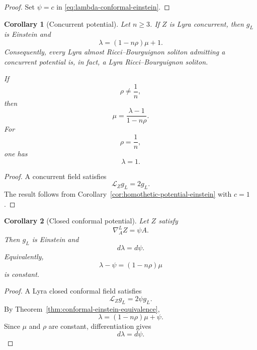 \documentclass[a4paper,11pt]{article}
\theoremstyle{plain}
\newtheorem{corollary} {Corollary}[section]
\numberwithin{equation}{section}
\begin{document}
\begin{proof}
	Set \(\psi=c\) in
	\eqref{eq:lambda-conformal-einstein}.
\end{proof}

\begin{corollary}[Concurrent potential]
	\label{cor:concurrent-potential-einstein}
	Let \(n\geq3\). If \(Z\) is Lyra concurrent, then \(g_{L}\) is
	Einstein and
	\begin{equation}
		\lambda
		=
		(1-n\rho)\mu+1.
		\label{eq:concurrent-soliton-relation}
	\end{equation}
	Consequently, every Lyra almost Ricci--Bourguignon soliton
	admitting a concurrent potential is, in fact, a Lyra
	Ricci--Bourguignon soliton.
	
	If
	\[
	\rho\neq\frac1n,
	\]
	then
	\begin{equation}
		\mu
		=
		\frac{\lambda-1}{1-n\rho}.
		\label{eq:concurrent-einstein-factor}
	\end{equation}
	For
	\[
	\rho=\frac1n,
	\]
	one has
	\begin{equation}
		\lambda=1.
		\label{eq:critical-concurrent-lambda}
	\end{equation}
\end{corollary}

\begin{proof}
	A concurrent field satisfies
	\[
	\mathcal L_{Z}g_{L}=2g_{L}.
	\]
	The result follows from
	Corollary~\ref{cor:homothetic-potential-einstein} with \(c=1\).
\end{proof}

\begin{corollary}[Closed conformal potential]
	\label{cor:closed-conformal-potential}
	Let \(Z\) satisfy
	\[
	\nabla^{L}_{A}Z=\psi A.
	\]
	Then \(g_{L}\) is Einstein and
	\begin{equation}
		d\lambda=d\psi.
		\label{eq:lambda-psi-differential}
	\end{equation}
	Equivalently,
	\begin{equation}
		\lambda-\psi
		=
		(1-n\rho)\mu
		\label{eq:lambda-psi-constant}
	\end{equation}
	is constant.
\end{corollary}

\begin{proof}
	A Lyra closed conformal field satisfies
	\[
	\mathcal L_{Z}g_{L}=2\psi g_{L}.
	\]
	By Theorem~\ref{thm:conformal-einstein-equivalence},
	\[
	\lambda
	=
	(1-n\rho)\mu+\psi.
	\]
	Since \(\mu\) and \(\rho\) are constant, differentiation gives
	\[
	d\lambda=d\psi.
	\]
\end{proof}
\end{document}
